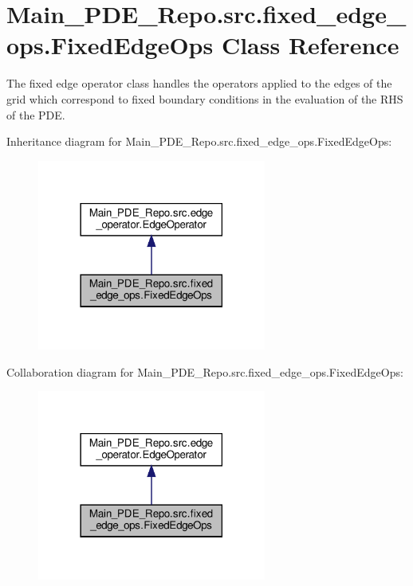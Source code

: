 \hypertarget{classMain__PDE__Repo_1_1src_1_1fixed__edge__ops_1_1FixedEdgeOps}{}\section{Main\+\_\+\+P\+D\+E\+\_\+\+Repo.\+src.\+fixed\+\_\+edge\+\_\+ops.\+Fixed\+Edge\+Ops Class Reference}
\label{classMain__PDE__Repo_1_1src_1_1fixed__edge__ops_1_1FixedEdgeOps}


The fixed edge operator class handles the operators applied to the edges of the grid which correspond to fixed boundary conditions in the evaluation of the R\+HS of the P\+DE.  




Inheritance diagram for Main\+\_\+\+P\+D\+E\+\_\+\+Repo.\+src.\+fixed\+\_\+edge\+\_\+ops.\+Fixed\+Edge\+Ops\+:
\nopagebreak
\begin{figure}[H]
\begin{center}
\leavevmode
\includegraphics[width=213pt]{classMain__PDE__Repo_1_1src_1_1fixed__edge__ops_1_1FixedEdgeOps__inherit__graph}
\end{center}
\end{figure}


Collaboration diagram for Main\+\_\+\+P\+D\+E\+\_\+\+Repo.\+src.\+fixed\+\_\+edge\+\_\+ops.\+Fixed\+Edge\+Ops\+:
\nopagebreak
\begin{figure}[H]
\begin{center}
\leavevmode
\includegraphics[width=213pt]{classMain__PDE__Repo_1_1src_1_1fixed__edge__ops_1_1FixedEdgeOps__coll__graph}
\end{center}
\end{figure}
